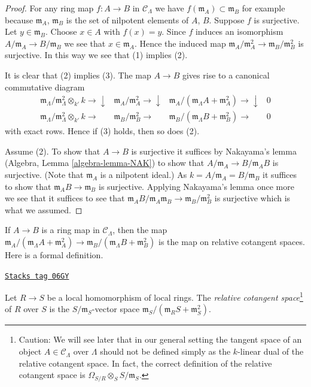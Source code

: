 \begin{proof}
For any ring map $f : A \to B$ in $\mathcal{C}_\Lambda$ we have
$f(\mathfrak m_A) \subset \mathfrak m_B$ for example because
$\mathfrak m_A$, $\mathfrak m_B$ is the set of nilpotent elements of
$A$, $B$. Suppose $f$ is surjective. Let $y \in \mathfrak m_B$.
Choose $x \in A$ with $f(x) = y$. Since $f$ induces an isomorphism
$A/\mathfrak m_A \to B/\mathfrak m_B$ we see that $x \in \mathfrak m_A$.
Hence the induced map
$\mathfrak m_A/\mathfrak m_A^2 \to \mathfrak m_B/\mathfrak m_B^2$
is surjective. In this way we see that (1) implies (2).

\medskip\noindent
It is clear that (2) implies (3). The map $A \to B$ gives rise
to a canonical commutative diagram
$$
\begin{array}{cccc}\mathfrak m_\Lambda/\mathfrak m_\Lambda^2 \otimes_{k'} k \longrightarrow\downarrow & \mathfrak m_A/\mathfrak m_A^2 \longrightarrow\downarrow & \mathfrak m_A/(\mathfrak m_\Lambda A + \mathfrak m_A^2) \longrightarrow\downarrow & 0 \\ \mathfrak m_\Lambda/\mathfrak m_\Lambda^2 \otimes_{k'} k \longrightarrow & \mathfrak m_B/\mathfrak m_B^2 \longrightarrow & \mathfrak m_B/(\mathfrak m_\Lambda B + \mathfrak m_B^2) \longrightarrow & 0\end{array}
$$
with exact rows. Hence if (3) holds, then so does (2).

\medskip\noindent
Assume (2). To show that $A \to B$ is surjective it suffices by
Nakayama's lemma (Algebra, Lemma \ref{algebra-lemma-NAK})
to show that $A/\mathfrak m_A \to B/\mathfrak m_AB$ is surjective.
(Note that $\mathfrak m_A$ is a nilpotent ideal.)
As $k = A/\mathfrak m_A = B/\mathfrak m_B$ it suffices to show that
$\mathfrak m_AB \to \mathfrak m_B$ is surjective. Applying
Nakayama's lemma once more we see that it suffices to see that
$\mathfrak m_AB/\mathfrak m_A\mathfrak m_B \to \mathfrak m_B/\mathfrak m_B^2$
is surjective which is what we assumed.
\end{proof}

If $A \to B$ is a ring map in $\mathcal{C}_\Lambda$, then the map
$\mathfrak m_A/(\mathfrak m_\Lambda A + \mathfrak m_A^2)
\to \mathfrak m_B/(\mathfrak m_\Lambda B + \mathfrak m_B^2)$
is the map on relative cotangent spaces. Here is a formal definition.

\begin{definition}
\label{formal-defos-definition-tangent-space-ring}
\href{https://stacks.math.columbia.edu/tag/06GY}{\texttt{Stacks tag 06GY}}

Let $R \to S$ be a local homomorphism of local rings. The
{\it relative cotangent space}\footnote{Caution: We will see later
that in our general setting the tangent
space of an object $A \in \mathcal{C}_\Lambda$ over $\Lambda$ should
not be defined simply as the $k$-linear dual of the relative
cotangent space. In fact, the correct definition of the relative
cotangent space is
$\Omega_{S/R} \otimes_S S/\mathfrak m_S$.} of $R$ over $S$ is the
$S/\mathfrak m_S$-vector space
$\mathfrak m_S/(\mathfrak m_R S + \mathfrak m_S^2)$.
\end{definition}

